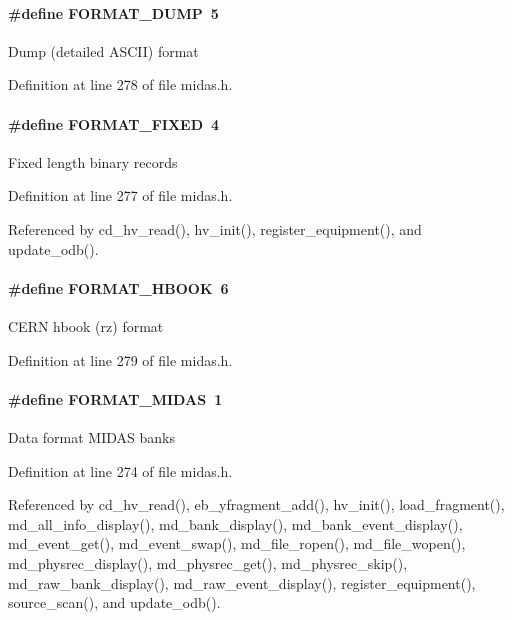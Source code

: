 \paragraph[{FORMAT\_\-DUMP}]{\setlength{\rightskip}{0pt plus 5cm}\#define FORMAT\_\-DUMP~5}\hfill\label{group__mdefineh_gaffaf04a985dfa6ff43ab39a8c6e3f0a7}
Dump (detailed ASCII) format 

Definition at line 278 of file midas.h.
\paragraph[{FORMAT\_\-FIXED}]{\setlength{\rightskip}{0pt plus 5cm}\#define FORMAT\_\-FIXED~4}\hfill\label{group__mdefineh_ga44835dd4c169e13e0fedf8c01a54dc2b}
Fixed length binary records 

Definition at line 277 of file midas.h.

Referenced by cd\_\-hv\_\-read(), hv\_\-init(), register\_\-equipment(), and update\_\-odb().
\paragraph[{FORMAT\_\-HBOOK}]{\setlength{\rightskip}{0pt plus 5cm}\#define FORMAT\_\-HBOOK~6}\hfill\label{group__mdefineh_gac3a857e4820ecdaa22f9a66a560dccad}
CERN hbook (rz) format 

Definition at line 279 of file midas.h.
\paragraph[{FORMAT\_\-MIDAS}]{\setlength{\rightskip}{0pt plus 5cm}\#define FORMAT\_\-MIDAS~1}\hfill\label{group__mdefineh_gac7ef5b0cbb1fc1d26c3bfd4cc4a191a9}
Data format MIDAS banks 

Definition at line 274 of file midas.h.

Referenced by cd\_\-hv\_\-read(), eb\_\-yfragment\_\-add(), hv\_\-init(), load\_\-fragment(), md\_\-all\_\-info\_\-display(), md\_\-bank\_\-display(), md\_\-bank\_\-event\_\-display(), md\_\-event\_\-get(), md\_\-event\_\-swap(), md\_\-file\_\-ropen(), md\_\-file\_\-wopen(), md\_\-physrec\_\-display(), md\_\-physrec\_\-get(), md\_\-physrec\_\-skip(), md\_\-raw\_\-bank\_\-display(), md\_\-raw\_\-event\_\-display(), register\_\-equipment(), source\_\-scan(), and update\_\-odb().
